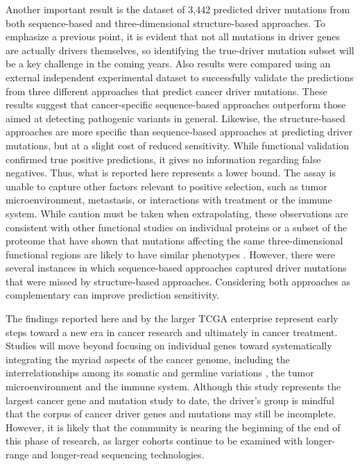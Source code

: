 Another important result is the dataset of 3,442 predicted driver mutations from both sequence-based and three-dimensional structure-based approaches. To emphasize a previous point, it is evident that not all mutations in driver genes are actually drivers themselves, so identifying the true-driver mutation subset will be a key challenge in the coming years. Also results were compared using an external independent experimental dataset to successfully validate the predictions from three different approaches that predict cancer driver mutations. These results suggest that cancer-specific sequence-based approaches outperform those aimed at detecting pathogenic variants in general. Likewise, the structure-based approaches are more specific than sequence-based approaches at predicting driver mutations, but at a slight cost of reduced sensitivity. While functional validation confirmed true positive predictions, it gives no information regarding false negatives. Thus, what is reported here represents a lower bound. The assay is unable to capture other factors relevant to positive selection, such as tumor microenvironment, metastasis, or interactions with treatment or the immune system. While caution must be taken when extrapolating, these observations are consistent with other functional studies on individual proteins or a subset of the proteome that have shown that mutations affecting the same three-dimensional functional regions are likely to have similar phenotypes \cite{RN198}. However, there were several instances in which sequence-based approaches captured driver mutations that were missed by structure-based approaches. Considering both approaches as complementary can improve prediction sensitivity.

The findings reported here and by the larger TCGA enterprise represent early steps toward a new era in cancer research and ultimately in cancer treatment. Studies will move beyond focusing on individual genes toward systematically integrating the myriad aspects of the cancer genome, including the interrelationships among its somatic and germline variations \cite{RN197}, the tumor microenvironment and the immune system. Although this study represents the largest cancer gene and mutation study to date, the driver's group is mindful that the corpus of cancer driver genes and mutations may still be incomplete. However, it is likely that the community is nearing the beginning of the end of this phase of research, as larger cohorts continue to be examined with longer-range and longer-read sequencing technologies.
